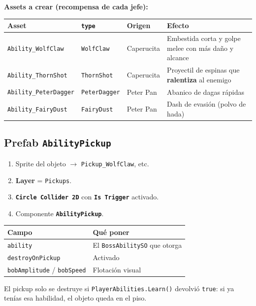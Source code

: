 \documentclass[a4paper,12pt]{article}
\newcommand{\code}[1]{\texttt{#1}}
\begin{document}
\textbf{Assets a crear (recompensa de cada jefe):}

\begin{center}
\begin{longtable}{|l|l|l|p{4.4cm}|}
\hline
\textbf{Asset} & \textbf{\code{type}} & \textbf{Origen} & \textbf{Efecto} \\
\hline
\endhead
\code{Ability\_WolfClaw} & \code{WolfClaw} & Caperucita & Embestida corta y golpe melee con más daño y alcance \\
\hline
\code{Ability\_ThornShot} & \code{ThornShot} & Caperucita & Proyectil de espinas que \textbf{ralentiza} al enemigo \\
\hline
\code{Ability\_PeterDagger} & \code{PeterDagger} & Peter Pan & Abanico de dagas rápidas \\
\hline
\code{Ability\_FairyDust} & \code{FairyDust} & Peter Pan & Dash de evasión (polvo de hada) \\
\hline
\end{longtable}
\end{center}

\subsection{Prefab \code{AbilityPickup}}

\begin{enumerate}
    \item Sprite del objeto $\to$ \code{Pickup\_WolfClaw}, etc.
    \item \textbf{Layer} = \code{Pickups}.
    \item \textbf{\code{Circle Collider 2D}} con \textbf{\code{Is Trigger}} activado.
    \item Componente \textbf{\code{AbilityPickup}}.
\end{enumerate}

\begin{center}
\begin{tabular}{|l|p{8.4cm}|}
\hline
\textbf{Campo} & \textbf{Qué poner} \\
\hline
\code{ability} & El \code{BossAbilitySO} que otorga \\
\hline
\code{destroyOnPickup} & Activado \\
\hline
\code{bobAmplitude} / \code{bobSpeed} & Flotación visual \\
\hline
\end{tabular}
\end{center}

El pickup solo se destruye si \code{PlayerAbilities.Learn()} devolvió \code{true}: si ya tenías
esa habilidad, el objeto queda en el piso.
\end{document}
